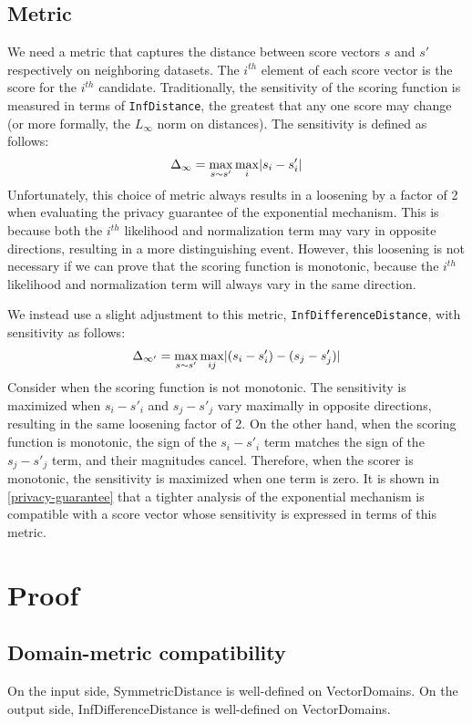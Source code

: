 \subsection{Metric}
We need a metric that captures the distance between score vectors $s$ and $s'$ respectively on neighboring datasets. 
The $i^{th}$ element of each score vector is the score for the $i^{th}$ candidate.
Traditionally, the sensitivity of the scoring function is measured in terms of \texttt{InfDistance}, 
the greatest that any one score may change (or more formally, the $L_\infty$ norm on distances).
The sensitivity is defined as follows:
\begin{equation}
    \Delta_{\infty} = \max\limits_{s \sim s'} \max\limits_{i} \lvert s_i - s'_i\rvert
\end{equation}
Unfortunately, this choice of metric always results in a loosening by a factor of 2 when evaluating the privacy guarantee of the exponential mechanism.
This is because both the $i^{th}$ likelihood and normalization term may vary in opposite directions, resulting in a more distinguishing event.
However, this loosening is not necessary if we can prove that the scoring function is monotonic, because the $i^{th}$ likelihood and normalization term will always vary in the same direction.

We instead use a slight adjustment to this metric, \texttt{InfDifferenceDistance}, with sensitivity as follows:
\begin{equation}
    \Delta_{\infty'} = \max\limits_{s \sim s'} \max\limits_{ij} \lvert(s_i - s'_i) - (s_j - s'_j)\rvert
\end{equation}
Consider when the scoring function is not monotonic.
The sensitivity is maximized when $s_i - s'_i$ and $s_j - s'_j$ vary maximally in opposite directions, resulting in the same loosening factor of 2.
On the other hand, when the scoring function is monotonic, the sign of the $s_i - s'_i$ term matches the sign of the $s_j - s'_j$ term,
and their magnitudes cancel.
Therefore, when the scorer is monotonic, the sensitivity is maximized when one term is zero. 
It is shown in \ref{privacy-guarantee} that a tighter analysis of the exponential mechanism is compatible with a score vector whose sensitivity is expressed in terms of this metric.

\section{Proof}
\subsection{Domain-metric compatibility}
On the input side, SymmetricDistance is well-defined on VectorDomains. 
On the output side, InfDifferenceDistance is well-defined on VectorDomains.

